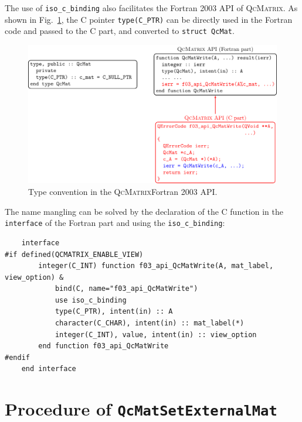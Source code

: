 \documentclass[a4paper,11pt,twoside,openright]{book}
\begin{document}
The use of \verb|iso_c_binding| also facilitates the Fortran 2003 API of \textsc{QcMatrix}.
As shown in Fig.~\ref{fig-F03-API-type}, the C pointer \verb|type(C_PTR)| can be directly
used in the Fortran code and passed to the C part, and converted to \verb|struct QcMat|.
\begin{figure}[hbtp]
  \centering
  \includegraphics[width=16cm]{F03_api_type.pdf}
  \caption{Type convention in the \textsc{QcMatrix}Fortran 2003 API.}
  \label{fig-F03-API-type}
\end{figure}

The name mangling can be solved by the declaration of the C function in the
\verb|interface| of the Fortran part and using the \verb|iso_c_binding|:
\begin{verbatim}
    interface
#if defined(QCMATRIX_ENABLE_VIEW)
        integer(C_INT) function f03_api_QcMatWrite(A, mat_label, view_option) &
            bind(C, name="f03_api_QcMatWrite")
            use iso_c_binding
            type(C_PTR), intent(in) :: A
            character(C_CHAR), intent(in) :: mat_label(*)
            integer(C_INT), value, intent(in) :: view_option
        end function f03_api_QcMatWrite
#endif
    end interface
\end{verbatim}

\section{Procedure of \texttt{QcMatSetExternalMat}}
\label{section-procedure-QcMatSetExternalMat}
\end{document}
